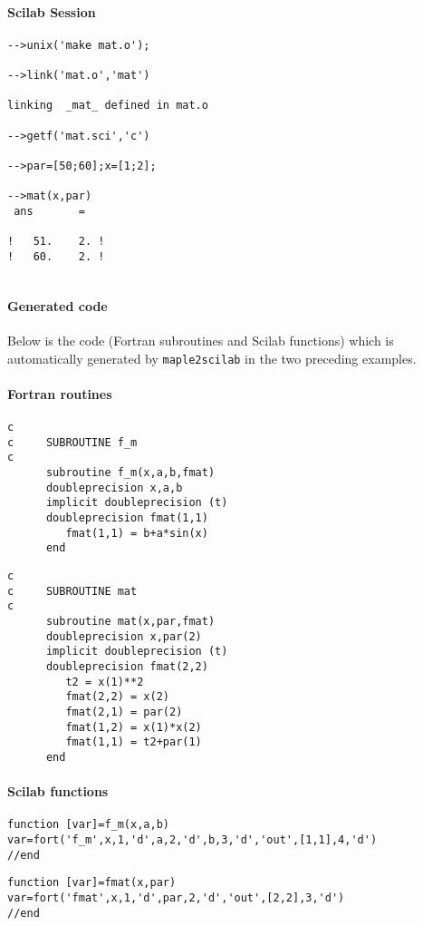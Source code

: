 \paragraph{Scilab Session}
\begin{verbatim}
-->unix('make mat.o');

-->link('mat.o','mat') 

linking  _mat_ defined in mat.o  
 
-->getf('mat.sci','c')

-->par=[50;60];x=[1;2];
 
-->mat(x,par)
 ans       =
 
!   51.    2. !
!   60.    2. !
 
\end{verbatim}

{\small
\paragraph{Generated code}
Below is the code (Fortran subroutines and Scilab functions) which is 
automatically generated by {\tt maple2scilab} in the two preceding  examples.
\paragraph{Fortran routines}
\begin{verbatim}
c      
c     SUBROUTINE f_m
c      
      subroutine f_m(x,a,b,fmat)
      doubleprecision x,a,b
      implicit doubleprecision (t)
      doubleprecision fmat(1,1)
         fmat(1,1) = b+a*sin(x)
      end
\end{verbatim}
\begin{verbatim}
c      
c     SUBROUTINE mat
c      
      subroutine mat(x,par,fmat)
      doubleprecision x,par(2)
      implicit doubleprecision (t)
      doubleprecision fmat(2,2)
         t2 = x(1)**2
         fmat(2,2) = x(2)
         fmat(2,1) = par(2)
         fmat(1,2) = x(1)*x(2)
         fmat(1,1) = t2+par(1)
      end
\end{verbatim}
\paragraph{Scilab functions}
\begin{verbatim}
function [var]=f_m(x,a,b)
var=fort('f_m',x,1,'d',a,2,'d',b,3,'d','out',[1,1],4,'d')
//end
\end{verbatim}
\begin{verbatim}
function [var]=fmat(x,par)
var=fort('fmat',x,1,'d',par,2,'d','out',[2,2],3,'d')
//end
\end{verbatim}
}
%



